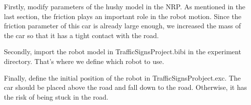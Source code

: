 Firstly, modify parameters of the hushy model in the NRP. As mentioned in the last section, the friction plays an important role in the robot motion. Since the friction parameter of this car is already large enough, we increased the mass of the car so that it has a tight contact with the road.


Secondly, import the robot model in TrafficSignsProject.bibi in the experiment directory. That's where we define which robot to use.


Finally, define the initial position of the robot in TrafficSignsProbject.exc. The car should be placed above the road and fall down to the road. Otherwise, it has the risk of being stuck in the road.



